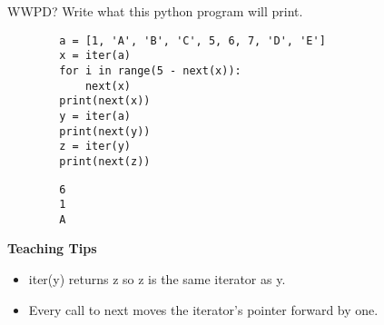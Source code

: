 \begin{blocksection}
    \question WWPD? Write what this python program will print.
    
    \begin{lstlisting}
        a = [1, 'A', 'B', 'C', 5, 6, 7, 'D', 'E']
        x = iter(a)
        for i in range(5 - next(x)):
            next(x)
        print(next(x))
        y = iter(a)
        print(next(y))
        z = iter(y)
        print(next(z))        
    \end{lstlisting}
    
    \begin{solution}[0.7in]
    \begin{lstlisting}
        6
        1
        A
    \end{lstlisting}
    \end{solution}
\end{blocksection}
    
    \begin{guide}
    \begin{blocksection}
        \textbf{Teaching Tips}
        \begin{itemize}
        \item iter(y) returns z so z is the same iterator as y.
        \item Every call to next moves the iterator's pointer forward by one.
        \end{itemize}
    \end{blocksection}
    \end{guide}